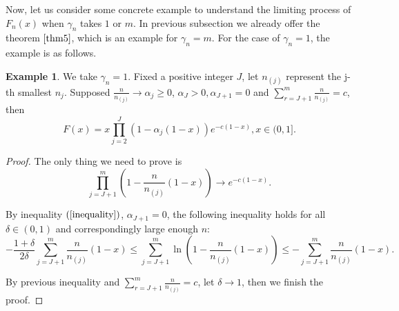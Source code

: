 \documentclass[12pt]{article}
\theoremstyle{plain}
\theoremstyle{definition}
\newtheorem{exm}{\textbf{Example}}
\theoremstyle{remark}
\begin{document}
Now, let us consider some concrete example to understand the limiting process of $F_n(x)$ when $\gamma_{n}$ takes $1$ or $m$. In previous subsection we already offer the theorem $\ref{thm5}$, which is an example for $\gamma_{n}=m$. For the case of $\gamma_{n}=1$, the example is as follows.
\begin{exm}\label{ex4.1}
	We take $\gamma_n=1$. Fixed a positive integer $J$, let $n_{(j)}$ represent the j-th smallest $n_j$. Supposed $\frac{n}{n_{(j)}}\rightarrow \alpha_j \geq 0$, $\alpha _J>0,  \alpha_{J+1}=0$ and $\sum_{r=J+1}^{m} \frac{n}{n_{(j)}}=c$, then 
	\begin{equation}
	F(x)=x\prod_{j=2}^{J}\left(1-\alpha_j(1-x)\right)e^{-c(1-x)},x\in (0,1].
	\end{equation}
\end{exm}
\begin{proof}
	The only thing we need to prove is 
	\begin{equation*}
		\prod_{j=J+1}^{m}\left(1-\frac{n}{n_{(j)}}(1-x)\right)\rightarrow e^{-c(1-x)}.
	\end{equation*}
	
	By inequality $(\ref{inequality})$, $ \alpha_{J+1}=0$, the following inequality holds for all $\delta\in (0,1)$ and correspondingly large enough $n$:
	\begin{equation*}
		-\frac{1+\delta}{2 \delta} \sum_{j=J+1}^{m} \frac{ n}{n_{(j)}}(1-x) \leqslant  \sum_{j=J+1}^{m} \ln \left({1-   \frac{n}{n_{(j)}} (1-x)}\right) \leqslant-\sum_{j=J+1}^{m} \frac{n}{n_{(j)}} (1-x).
	\end{equation*}
	
	By previous inequality and $\sum_{r=J+1}^{m} \frac{n}{n_{(j)}}=c$, let $\delta \rightarrow 1$, then we finish the proof.
\end{proof}
\end{document}
